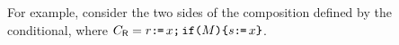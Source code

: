 %
For example, 
consider the two sides of the composition defined by the conditional, where
$\cmdR = \aReg\GETS x \SEMI \IF{\aExp}\THEN \bReg\GETS x \FI$.
